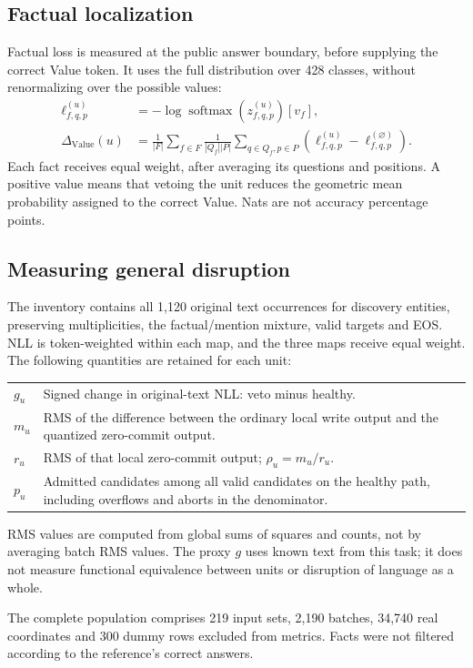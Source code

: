 \documentclass[11pt,a4paper]{article}
\newcommand{\factloss}{\Delta_{\mathrm{Value}}}
\begin{document}
\subsection{Factual localization}
Factual loss is measured at the public answer boundary, before supplying the
correct Value token. It uses the full distribution over 428 classes, without
renormalizing over the possible values:
\begin{align}
\ell_{f,q,p}^{(u)}&=-\log\operatorname{softmax}(z_{f,q,p}^{(u)})[v_f],\\
\factloss(u)&=\frac{1}{|F|}\sum_{f\in F}
  \frac{1}{|Q_f||P|}\sum_{q\in Q_f,p\in P}
  \left(\ell_{f,q,p}^{(u)}-\ell_{f,q,p}^{(\varnothing)}\right).
\end{align}
Each fact receives equal weight, after averaging its questions and positions.
A positive value means that vetoing the unit reduces the geometric mean
probability assigned to the correct Value. Nats are not accuracy percentage points.

\subsection{Measuring general disruption}
The inventory contains all 1,120 original text occurrences for discovery
entities, preserving multiplicities, the factual/mention mixture, valid targets
and EOS. NLL is token-weighted within each map, and the three maps receive equal
weight. The following quantities are retained for each unit:
\begin{tabularx}{\linewidth}{@{}p{15mm}Y@{}}
\toprule
$g_u$ & Signed change in original-text NLL: veto minus healthy.\\
$m_u$ & RMS of the difference between the ordinary local write output and the quantized zero-commit output.\\
$r_u$ & RMS of that local zero-commit output; $\rho_u=m_u/r_u$.\\
$p_u$ & Admitted candidates among all valid candidates on the healthy path, including overflows and aborts in the denominator.\\
\bottomrule
\end{tabularx}

RMS values are computed from global sums of squares and counts, not by
averaging batch RMS values. The proxy $g$ uses known text from this task; it
does not measure functional equivalence between units or disruption of language
as a whole.

The complete population comprises 219 input sets, 2,190 batches, 34,740 real
coordinates and 300 dummy rows excluded from metrics. Facts were not filtered
according to the reference's correct answers.
\end{document}
